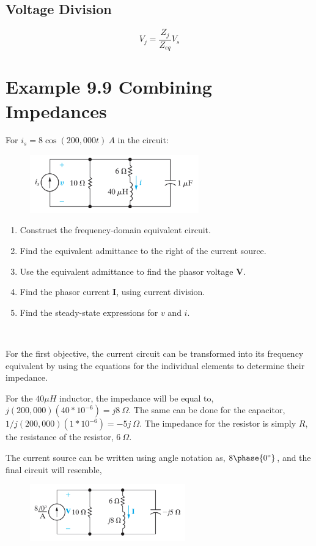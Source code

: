 \documentclass[12pt]{article}
\begin{document}
    \subsection*{Voltage Division}
    \[
        V_j = \frac{Z_j}{Z_{eq}} V_s
    \]
    \section*{Example 9.9 Combining Impedances}
    For $i_s = 8 \cos (200,000t)\ A$ in the circuit:
    \begin{figure}[h]
        \centering
        \includegraphics[width=0.65\textwidth]{Series and Parallel Impedences.png}
    \end{figure}
    \begin{enumerate}
        \item Construct the frequency-domain equivalent circuit.
        \item Find the equivalent admittance to the right of the current source.
        \item Use the equivalent admittance to find the phasor voltage
            \textbf{V}.
        \item Find the phasor current \textbf{I}, using current division.
        \item Find the steady-state expressions for $v$ and $i$.
    \end{enumerate}
    \,
    \par For the first objective, the current circuit can be transformed into
    its frequency equivalent by using the equations for the individual elements
    to determine their impedance.
    \par For the $40 \mu H$ inductor, the impedance will be equal to,
    $j(200,000)(40*10^{-6}) = j 8\ \Omega$. The same can be done for the
    capacitor, $1 / j(200,000)(1*10^{-6}) = -5j\ \Omega$. The impedance for the
    resistor is simply $R$, the resistance of the resistor, $6\ \Omega$.
    \par The current source can be written using angle notation as, $8
    \phase{0^{\circ}}$, and the final circuit will resemble,
    \begin{figure}[h]
        \centering
        \includegraphics[width=0.6\textwidth]{Frequency-Domain Circuit.png}
    \end{figure}
\end{document}
